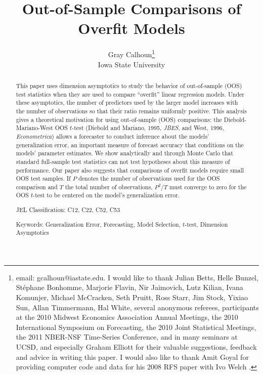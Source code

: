 \documentclass[12pt,draft]{article}
\title{Out-of-Sample Comparisons of Overfit Models}
\author{Gray Calhoun\thanks{email: gcalhoun@iastate.edu. I
    would like to thank Julian Betts, Helle Bunzel,
    St\'ephane Bonhomme, Marjorie Flavin,
    Nir Jaimovich, Lutz Kilian, Ivana Komunjer, Michael McCracken,
    Seth Pruitt, Ross Starr, Jim Stock, Yixiao Sun, Allan Timmermann,
    Hal White, several anonymous referees, participants at the 2010
    Midwest Economics Association Annual Meetings, the 2010
    International Symposium on Forecasting, the 2010 Joint Statistical
    Meetings, the 2011 NBER-NSF Time-Series
    Conference, and in many seminars at UCSD, and especially
    Graham Elliott for their valuable suggestions, feedback and advice
    in writing this paper.  I would also like to thank Amit Goyal for
    providing computer code and data for his 2008 RFS paper
    with Ivo Welch \citep{GoW:08}.} \\ Iowa State University}
\date{\VERSION}
\begin{document}
\maketitle

\begin{abstract}\noindent
  This paper uses dimension asymptotics to study the behavior of
  out-of-sample (OOS) test statistics when they are used to compare
  ``overfit'' linear regression models. Under these asymptotics, the
  number of predictors used by the larger model increases with the
  number of observations so that their ratio remains uniformly
  positive. This analysis gives a theoretical motivation for using
  out-of-sample (OOS) comparisons: the Diebold-Mariano-West OOS $t$-test
  (Diebold and Mariano, 1995, \textit{JBES}, and West, 1996,
  \textit{Econometrica}) allows a forecaster to conduct inference
  about the models' generalization error, an important measure of
  forecast accuracy that conditions on the models' parameter estimates.
  We show analytically and through Monte Carlo that standard full-sample
  test statistics can not test hypotheses about this measure of performance.
  Our paper also suggests that comparisons of overfit models require small
  OOS test samples. If $P$ denotes the number of observations used for the
  OOS comparison and $T$ the total number of observations, $P^2/T$ must
  converge to zero for the OOS $t$-test to be centered on the model's
  generalization error.

\noindent JEL Classification: C12, C22, C52, C53

\noindent Keywords: Generalization Error, Forecasting, Model
Selection, $t$-test, Dimension Asymptotics
\end{abstract}








\appendix

















\end{document}
